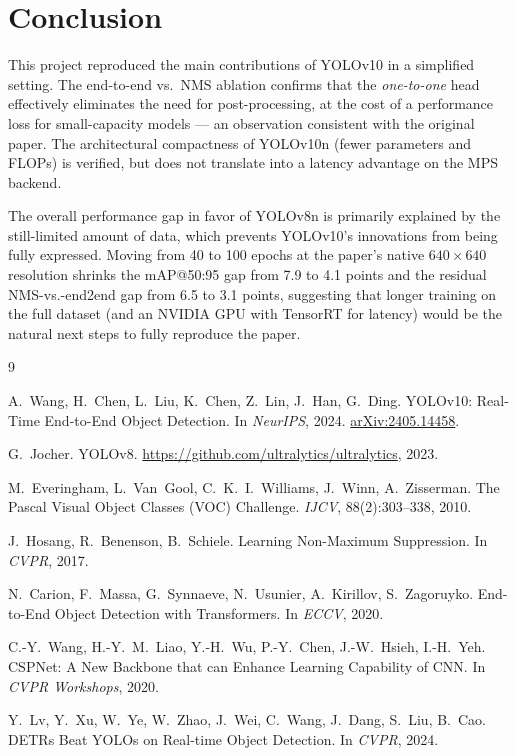 \documentclass[11pt,a4paper]{article}
\begin{document}
\section{Conclusion}

This project reproduced the main contributions of YOLOv10 in a simplified setting. The end-to-end vs.\ NMS ablation confirms that the \emph{one-to-one} head effectively eliminates the need for post-processing, at the cost of a performance loss for small-capacity models --- an observation consistent with the original paper. The architectural compactness of YOLOv10n (fewer parameters and FLOPs) is verified, but does not translate into a latency advantage on the MPS backend.

The overall performance gap in favor of YOLOv8n is primarily explained by the still-limited amount of data, which prevents YOLOv10's innovations from being fully expressed. Moving from 40 to 100 epochs at the paper's native $640\!\times\!640$ resolution shrinks the mAP@50:95 gap from 7.9 to 4.1 points and the residual NMS-vs.-end2end gap from 6.5 to 3.1 points, suggesting that longer training on the full dataset (and an NVIDIA GPU with TensorRT for latency) would be the natural next steps to fully reproduce the paper.

\begin{thebibliography}{9}

A.~Wang, H.~Chen, L.~Liu, K.~Chen, Z.~Lin, J.~Han, G.~Ding.
\newblock YOLOv10: Real-Time End-to-End Object Detection.
\newblock In \emph{NeurIPS}, 2024.
\newblock \href{https://arxiv.org/abs/2405.14458}{arXiv:2405.14458}.

G.~Jocher.
\newblock YOLOv8.
\newblock \url{https://github.com/ultralytics/ultralytics}, 2023.

M.~Everingham, L.~Van~Gool, C.~K.~I.~Williams, J.~Winn, A.~Zisserman.
\newblock The Pascal Visual Object Classes (VOC) Challenge.
\newblock \emph{IJCV}, 88(2):303--338, 2010.

J.~Hosang, R.~Benenson, B.~Schiele.
\newblock Learning Non-Maximum Suppression.
\newblock In \emph{CVPR}, 2017.

N.~Carion, F.~Massa, G.~Synnaeve, N.~Usunier, A.~Kirillov, S.~Zagoruyko.
\newblock End-to-End Object Detection with Transformers.
\newblock In \emph{ECCV}, 2020.

C.-Y.~Wang, H.-Y.~M.~Liao, Y.-H.~Wu, P.-Y.~Chen, J.-W.~Hsieh, I.-H.~Yeh.
\newblock CSPNet: A New Backbone that can Enhance Learning Capability of CNN.
\newblock In \emph{CVPR Workshops}, 2020.

Y.~Lv, Y.~Xu, W.~Ye, W.~Zhao, J.~Wei, C.~Wang, J.~Dang, S.~Liu, B.~Cao.
\newblock DETRs Beat YOLOs on Real-time Object Detection.
\newblock In \emph{CVPR}, 2024.

\end{thebibliography}
\end{document}
